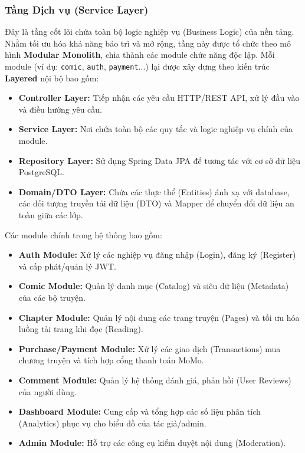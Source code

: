 \subsubsection{Tầng Dịch vụ (Service Layer)}
Đây là tầng cốt lõi chứa toàn bộ logic nghiệp vụ (Business Logic) của nền tảng. Nhằm tối ưu hóa khả năng bảo trì và mở rộng, tầng này được tổ chức theo mô hình \textbf{Modular Monolith}, chia thành các module chức năng độc lập. Mỗi module (ví dụ: \texttt{comic}, \texttt{auth}, \texttt{payment}...) lại được xây dựng theo kiến trúc \textbf{Layered} nội bộ bao gồm:
\begin{itemize}
    \item \textbf{Controller Layer:} Tiếp nhận các yêu cầu HTTP/REST API, xử lý đầu vào và điều hướng yêu cầu.
    \item \textbf{Service Layer:} Nơi chứa toàn bộ các quy tắc và logic nghiệp vụ chính của module.
    \item \textbf{Repository Layer:} Sử dụng Spring Data JPA để tương tác với cơ sở dữ liệu PostgreSQL.
    \item \textbf{Domain/DTO Layer:} Chứa các thực thể (Entities) ánh xạ với database, các đối tượng truyền tải dữ liệu (DTO) và Mapper để chuyển đổi dữ liệu an toàn giữa các lớp.
\end{itemize}

Các module chính trong hệ thống bao gồm:
\begin{itemize}
    \item \textbf{Auth Module:} Xử lý các nghiệp vụ đăng nhập (Login), đăng ký (Register) và cấp phát/quản lý JWT.
    \item \textbf{Comic Module:} Quản lý danh mục (Catalog) và siêu dữ liệu (Metadata) của các bộ truyện.
    \item \textbf{Chapter Module:} Quản lý nội dung các trang truyện (Pages) và tối ưu hóa luồng tải trang khi đọc (Reading).
    \item \textbf{Purchase/Payment Module:} Xử lý các giao dịch (Transactions) mua chương truyện và tích hợp cổng thanh toán MoMo.
    \item \textbf{Comment Module:} Quản lý hệ thống đánh giá, phản hồi (User Reviews) của người dùng.
    \item \textbf{Dashboard Module:} Cung cấp và tổng hợp các số liệu phân tích (Analytics) phục vụ cho biểu đồ của tác giả/admin.
    \item \textbf{Admin Module:} Hỗ trợ các công cụ kiểm duyệt nội dung (Moderation).
\end{itemize}

